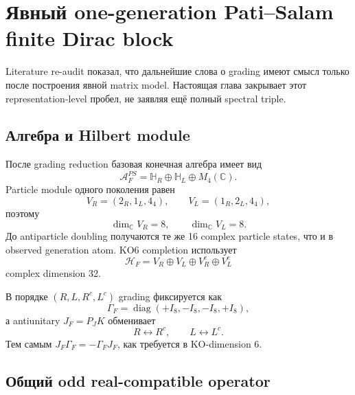 \chapter{Явный one-generation Pati--Salam finite Dirac block}

Literature re-audit показал, что дальнейшие слова о grading имеют смысл
только после построения явной matrix model. Настоящая глава закрывает этот
representation-level пробел, не заявляя ещё полный spectral triple.

\section{Алгебра и Hilbert module}

После grading reduction базовая конечная алгебра имеет вид
\begin{equation}
 \mathcal A_F^{PS}=\mathbb H_R\oplus\mathbb H_L\oplus M_4(\mathbb C).
\end{equation}
Particle module одного поколения равен
\begin{equation}
 V_R=(2_R,1_L,4_4),
 \qquad
 V_L=(1_R,2_L,4_4),
\end{equation}
поэтому
\begin{equation}
 \dim_\mathbb C V_R=8,
 \qquad
 \dim_\mathbb C V_L=8.
\end{equation}
До antiparticle doubling получаются те же 16 complex particle states, что и
в observed generation atom. KO6 completion использует
\begin{equation}
 \mathcal H_F=V_R\oplus V_L\oplus V_R^c\oplus V_L^c
\end{equation}
complex dimension 32.

В порядке \((R,L,R^c,L^c)\) grading фиксируется как
\begin{equation}
 \Gamma_F=\operatorname{diag}(+I_8,-I_8,-I_8,+I_8),
\end{equation}
а antiunitary \(J_F=P_JK\) обменивает
\begin{equation}
 R\leftrightarrow R^c,
 \qquad
 L\leftrightarrow L^c.
\end{equation}
Тем самым \(J_F\Gamma_F=-\Gamma_FJ_F\), как требуется в KO-dimension 6.

\section{Общий odd real-compatible operator}

